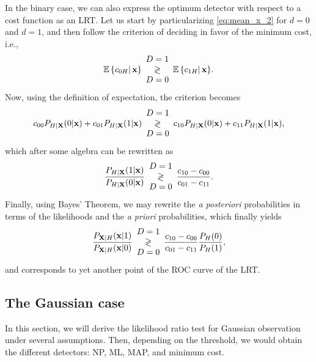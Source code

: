 In the binary case, we can also express the optimum detector with respect to a cost function as an LRT. Let us start by particularizing \eqref{eq:mean_x_2} for $d=0$ and $d=1$, and then follow the criterion of deciding in favor of the minimum cost, i.e.,
$$\mathbb{E}\left\{ c_{0H}\right|{\bf x}\} \begin{array}{c} D=1 \\ \gtrless \\ D=0 \end{array} \mathbb{E}\left\{ c_{1H}\right|{\bf x}\}.$$
Now, using the definition of expectation, the criterion becomes
$$c_{00}P_{H|{\bf X}}(0|{\bf x}) + c_{01} P_{H|{\bf X}}(1|{\bf x})\begin{array}{c} D=1 \\ \gtrless \\ D=0 \end{array} c_{10}P_{H|{\bf X}}(0|{\bf x}) + c_{11} P_{H|{\bf X}}(1|{\bf x}),$$
which after some algebra can be rewritten as
$$\displaystyle\frac{P_{H|{\bf X}}(1|{\bf x})}{P_{H|{\bf X}}(0|{\bf x})}\begin{array}{c} D=1 \\ \gtrless \\ D=0 \end{array} \displaystyle\frac{c_{10}-c_{00}}{c_{01}-c_{11}}.$$
Finally, using Bayes' Theorem, we may rewrite the \emph{a posteriori} probabilities in terms of the likelihoods and the \emph{a priori} probabilities, which finally yields
$$\displaystyle\frac{P_{{\bf X}|H}({\bf x}|1)}{P_{{\bf X}|H}({\bf x}|0)}\begin{array}{c} D=1 \\ \gtrless \\ D=0 \end{array} \displaystyle\frac{c_{10}-c_{00}}{c_{01}-c_{11}} \displaystyle\frac{P_H(0)}{P_H(1)},$$
and corresponds to yet another point of the ROC curve of the LRT.

\subsection{The Gaussian case}

In this section, we will derive the likelihood ratio test for Gaussian observation under several assumptions. Then, depending on the threshold, we would obtain the different detectors: NP, ML, MAP, and minimum cost.

